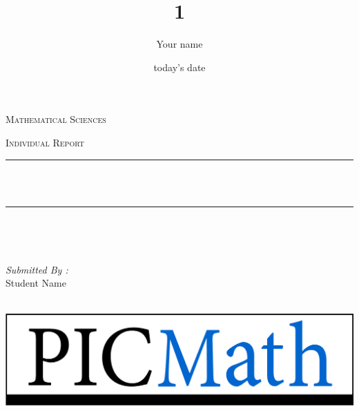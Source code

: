\documentclass[12pt]{report}
\title{1}
\author{ Your name}
\date{today's date}
\makeatletter
\let\thetitle\@title
\makeatother
\begin{document}

\begin{titlepage}
	\centering
    \vspace*{0.5 cm}
\begin{center}    \textsc{\Large   Mathematical Sciences}\\[2.0 cm]	\end{center}%
	\textsc{\Large Individual Report  }\\[0.5 cm]				%
	\rule{\linewidth}{0.2 mm} \\[0.4 cm]
	{ \huge \bfseries \thetitle}\\
	\rule{\linewidth}{0.2 mm} \\[1.5 cm]
	
	\begin{minipage}{0.4\textwidth}
		\begin{flushleft} \large
			\end{flushleft}
			\end{minipage}~
			\begin{minipage}{0.4\textwidth}
            
			\begin{flushright} \large
			\emph{Submitted By :} \\
			Student Name  
		\end{flushright}
           
	\end{minipage}\\[2 cm]
	
	\includegraphics[scale = 0.5]{PICMathLogo.png}
    
    
    
    
	
\end{titlepage}
\end{document}
